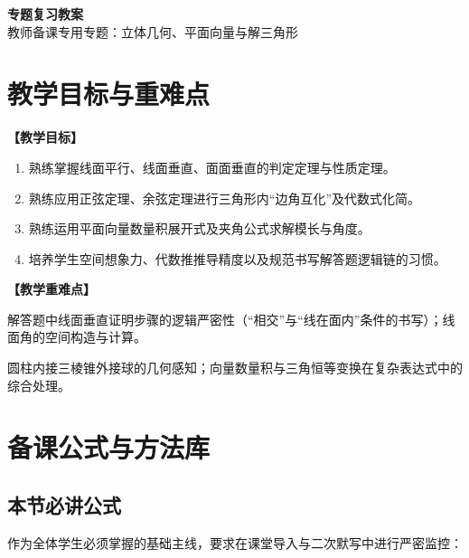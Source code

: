 \documentclass[11pt,a4paper]{ctexart}
\begin{document}
\begin{center}
  {\Large\bfseries 专题复习教案}\\
  \vspace{0.6em}
  {\large 教师备课专用\quad 专题：立体几何、平面向量与解三角形}
\end{center}

\section{教学目标与重难点}
\textbf{【教学目标】}
\begin{enumerate}[label=\arabic*. , leftmargin=2em, itemsep=0.1em, topsep=0.2em]
  \item 熟练掌握线面平行、线面垂直、面面垂直的判定定理与性质定理。
  \item 熟练应用正弦定理、余弦定理进行三角形内“边角互化”及代数式化简。
  \item 熟练运用平面向量数量积展开式及夹角公式求解模长与角度。
  \item 培养学生空间想象力、代数推推导精度以及规范书写解答题逻辑链的习惯。
\end{enumerate}

\vspace{0.8em}
\textbf{【教学重难点】}
\begin{description}[leftmargin=2em, itemsep=0.1em, topsep=0.2em]
  \item[重点] 解答题中线面垂直证明步骤的逻辑严密性（“相交”与“线在面内”条件的书写）；线面角的空间构造与计算。
  \item[难点] 圆柱内接三棱锥外接球的几何感知；向量数量积与三角恒等变换在复杂表达式中的综合处理。
\end{description}

\newpage

\section{备课公式与方法库}

\subsection{本节必讲公式}
作为全体学生必须掌握的基础主线，要求在课堂导入与二次默写中进行严密监控：
\end{document}
